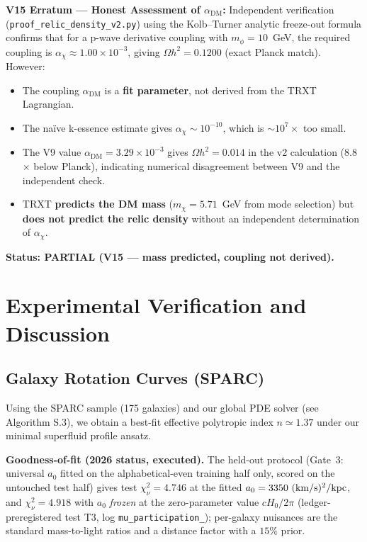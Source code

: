 \documentclass[a4paper,12pt]{article}
\begin{document}
\textbf{V15 Erratum --- Honest Assessment of $\alpha_{\mathrm{DM}}$:}
Independent verification (\texttt{proof\_\allowbreak relic\_\allowbreak density\_\allowbreak v2.py}) using the Kolb--Turner analytic freeze-out formula confirms that for a p-wave derivative coupling with $m_\phi = 10$~GeV, the required coupling is $\alpha_\chi \approx 1.00 \times 10^{-3}$, giving $\Omega h^2 = 0.1200$ (exact Planck match).  However:
\begin{itemize}
    \item The coupling $\alpha_{\mathrm{DM}}$ is a \textbf{fit parameter}, not derived from the TRXT Lagrangian.
    \item The na\"ive k-essence estimate gives $\alpha_\chi \sim 10^{-10}$, which is $\sim 10^7\times$ too small.
    \item The V9 value $\alpha_{\mathrm{DM}} = 3.29 \times 10^{-3}$ gives $\Omega h^2 = 0.014$ in the v2 calculation (8.8$\times$ below Planck), indicating numerical disagreement between V9 and the independent check.
    \item TRXT \textbf{predicts the DM mass} ($m_\chi = 5.71$~GeV from mode selection) but \textbf{does not predict the relic density} without an independent determination of $\alpha_\chi$.
\end{itemize}

\textbf{Status: PARTIAL (V15 --- mass predicted, coupling not derived).}

\section{Experimental Verification and Discussion}

\subsection{Galaxy Rotation Curves (SPARC)}
Using the SPARC sample (175 galaxies) \cite{lelli} and our global PDE solver (see
Algorithm S.3), we obtain a best-fit effective polytropic index $n \simeq 1.37$
under our minimal superfluid profile ansatz.

\textbf{Goodness-of-fit (2026 status, executed).} The held-out protocol (Gate~3:
universal $a_0$ fitted on the alphabetical-even training half only, scored on the
untouched test half) gives test $\chi^2_\nu = 4.746$ at the fitted
$a_0 = 3350\ {\rm (km/s)^2/kpc}$, and $\chi^2_\nu = 4.918$ with $a_0$ \emph{frozen} at
the zero-parameter value $cH_0/2\pi$ (ledger-preregistered test T3, log
\texttt{mu\_\allowbreak participation\_}); per-galaxy nuisances are the standard
mass-to-light ratios and a distance factor with a $15\%$ prior.
\end{document}
